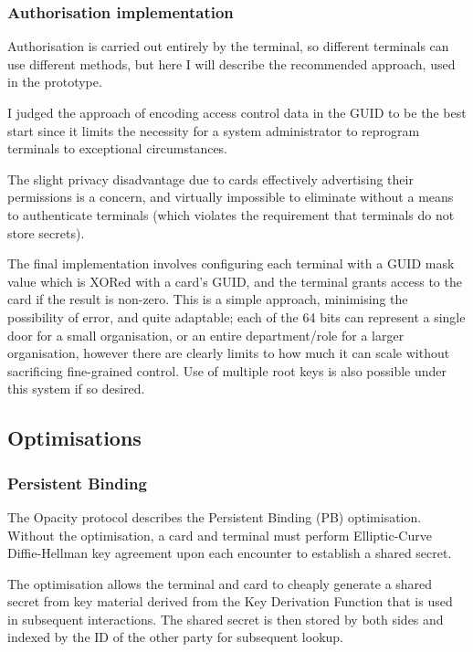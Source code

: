 \documentclass[12pt,a4paper]{article}
\begin{document}
\subsubsection{Authorisation implementation}
Authorisation is carried out entirely by the terminal, so different terminals can use different methods, but here I will describe the recommended approach, used in the prototype.

I judged the approach of encoding access control data in the GUID to be the best start since it limits the necessity for a system administrator to reprogram terminals to exceptional circumstances.

The slight privacy disadvantage due to cards effectively advertising their permissions is a concern, and virtually impossible to eliminate without a means to authenticate terminals (which violates the requirement that terminals do not store secrets).

The final implementation involves configuring each terminal with a GUID mask value which is XORed with a card's GUID, and the terminal grants access to the card if the result is non-zero. This is a simple approach, minimising the possibility of error, and quite adaptable; each of the 64 bits can represent a single door for a small organisation, or an entire department/role for a larger organisation, however there are clearly limits to how much it can scale without sacrificing fine-grained control. Use of multiple root keys is also possible under this system if so desired.

\subsection{Optimisations}
\label{sec:optimisations}
\subsubsection{Persistent Binding}
\label{subsec:pb}

The Opacity protocol describes the Persistent Binding (PB) optimisation. Without the optimisation, a card and terminal must perform Elliptic-Curve Diffie-Hellman key agreement upon each encounter to establish a shared secret. 

The optimisation allows the terminal and card to cheaply generate a shared secret from key material derived from the Key Derivation Function that is used in subsequent interactions. The shared secret is then stored by both sides and indexed by the ID of the other party for subsequent lookup.
\end{document}
